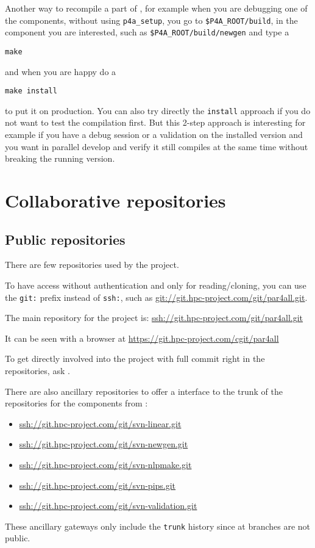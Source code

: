 \documentclass[a4paper]{article}
\begin{document}
Another way to recompile a part of \Apfa, for example when you are
debugging one of the components, without using \verb|p4a_setup|, you go to
\verb|$P4A_ROOT/build|, in the component you are interested, such as
\verb|$P4A_ROOT/build/newgen| and type a
\begin{verbatim}
make
\end{verbatim}
and when you are happy do a
\begin{verbatim}
make install
\end{verbatim}
to put it on production. You can also try directly the \texttt{install}
approach if you do not want to test the compilation first. But this 2-step
approach is interesting for example if you have a debug session or a
validation on the installed version and you want in parallel develop and
verify it still compiles at the same time without breaking the running
version.



\section{Collaborative repositories}
\label{sec:coll-repos}


\subsection{Public repositories}
\label{sec:public-repositories}

There are few \Agit repositories used by the project.

To have access without authentication and only for reading/cloning, you
can use the \texttt{git:} prefix instead of \texttt{ssh:}, such as
\url{git://git.hpc-project.com/git/par4all.git}.

The main repository for the project is:
\url{ssh://git.hpc-project.com/git/par4all.git}

It can be seen with a \Awww browser at
\url{https://git.hpc-project.com/cgit/par4all}

To get directly involved into the project with full commit right in the
repositories, ask \Ahpcp.

There are also ancillary \Agit repositories to offer a \Agit interface to
the trunk of the \Asvn repositories for the \Apips components from \Acri:
\begin{itemize}
\item \url{ssh://git.hpc-project.com/git/svn-linear.git}
\item \url{ssh://git.hpc-project.com/git/svn-newgen.git}
\item \url{ssh://git.hpc-project.com/git/svn-nlpmake.git}
\item \url{ssh://git.hpc-project.com/git/svn-pips.git}
\item \url{ssh://git.hpc-project.com/git/svn-validation.git}
\end{itemize}
These ancillary gateways only include the \texttt{trunk} history since at
\Acri branches are not public.
\end{document}
